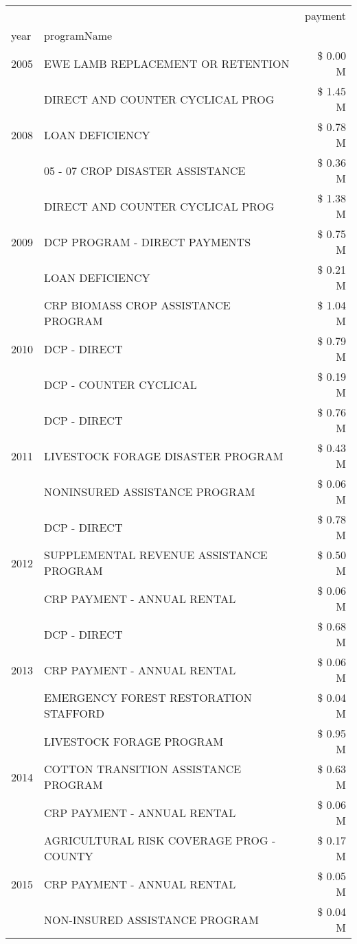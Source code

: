 \begin{tabular}{llr}
\toprule
 &  & payment \\
year & programName &  \\
\midrule
2005 & EWE LAMB REPLACEMENT OR RETENTION & \$ 0.00 M \\
\cline{1-3}
\multirow[t]{3}{*}{2008} & DIRECT AND COUNTER CYCLICAL PROG & \$ 1.45 M \\
 & LOAN DEFICIENCY & \$ 0.78 M \\
 & 05 - 07 CROP DISASTER ASSISTANCE & \$ 0.36 M \\
\cline{1-3}
\multirow[t]{3}{*}{2009} & DIRECT AND COUNTER CYCLICAL PROG & \$ 1.38 M \\
 & DCP PROGRAM - DIRECT PAYMENTS & \$ 0.75 M \\
 & LOAN DEFICIENCY & \$ 0.21 M \\
\cline{1-3}
\multirow[t]{3}{*}{2010} & CRP BIOMASS CROP ASSISTANCE PROGRAM & \$ 1.04 M \\
 & DCP - DIRECT & \$ 0.79 M \\
 & DCP - COUNTER CYCLICAL & \$ 0.19 M \\
\cline{1-3}
\multirow[t]{3}{*}{2011} & DCP - DIRECT & \$ 0.76 M \\
 & LIVESTOCK FORAGE DISASTER PROGRAM & \$ 0.43 M \\
 & NONINSURED ASSISTANCE PROGRAM & \$ 0.06 M \\
\cline{1-3}
\multirow[t]{3}{*}{2012} & DCP - DIRECT & \$ 0.78 M \\
 & SUPPLEMENTAL REVENUE ASSISTANCE PROGRAM & \$ 0.50 M \\
 & CRP PAYMENT - ANNUAL RENTAL & \$ 0.06 M \\
\cline{1-3}
\multirow[t]{3}{*}{2013} & DCP - DIRECT & \$ 0.68 M \\
 & CRP PAYMENT - ANNUAL RENTAL & \$ 0.06 M \\
 & EMERGENCY FOREST RESTORATION STAFFORD & \$ 0.04 M \\
\cline{1-3}
\multirow[t]{3}{*}{2014} & LIVESTOCK FORAGE PROGRAM & \$ 0.95 M \\
 & COTTON TRANSITION ASSISTANCE PROGRAM & \$ 0.63 M \\
 & CRP PAYMENT - ANNUAL RENTAL & \$ 0.06 M \\
\cline{1-3}
\multirow[t]{3}{*}{2015} & AGRICULTURAL RISK COVERAGE PROG - COUNTY & \$ 0.17 M \\
 & CRP PAYMENT - ANNUAL RENTAL & \$ 0.05 M \\
 & NON-INSURED ASSISTANCE PROGRAM & \$ 0.04 M \\

\end{tabular}
